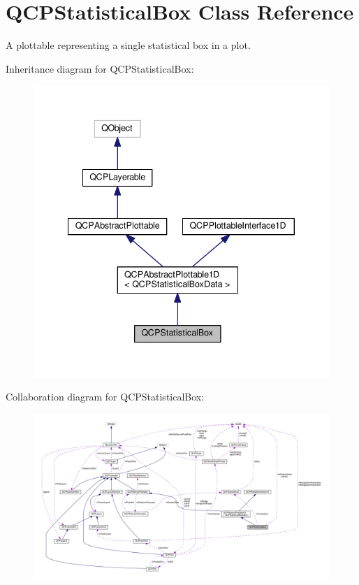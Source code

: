 \hypertarget{classQCPStatisticalBox}{}\section{Q\+C\+P\+Statistical\+Box Class Reference}
\label{classQCPStatisticalBox}


A plottable representing a single statistical box in a plot.  




Inheritance diagram for Q\+C\+P\+Statistical\+Box\+:
\nopagebreak
\begin{figure}[H]
\begin{center}
\leavevmode
\includegraphics[width=340pt]{classQCPStatisticalBox__inherit__graph}
\end{center}
\end{figure}


Collaboration diagram for Q\+C\+P\+Statistical\+Box\+:
\nopagebreak
\begin{figure}[H]
\begin{center}
\leavevmode
\includegraphics[width=350pt]{classQCPStatisticalBox__coll__graph}
\end{center}
\end{figure}
